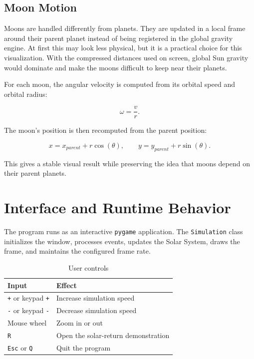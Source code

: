\documentclass[a4paper,12pt]{article}
\begin{document}
\subsection{Moon Motion}

Moons are handled differently from planets. They are updated in a local frame
around their parent planet instead of being registered in the global gravity
engine. At first this may look less physical, but it is a practical choice for
this visualization. With the compressed distances used on screen, global Sun
gravity would dominate and make the moons difficult to keep near their planets.

For each moon, the angular velocity is computed from its orbital speed and
orbital radius:

\begin{equation}
    \omega = \frac{v}{r}.
\end{equation}

The moon's position is then recomputed from the parent position:

\begin{equation}
    x = x_{parent} + r \cos(\theta), \qquad
    y = y_{parent} + r \sin(\theta).
\end{equation}

This gives a stable visual result while preserving the idea that moons depend
on their parent planets.

\section{Interface and Runtime Behavior}

The program runs as an interactive \texttt{pygame} application. The
\texttt{Simulation} class initializes the window, processes events, updates the
Solar System, draws the frame, and maintains the configured frame rate.

\begin{table}[H]
    \centering
    \caption{User controls}
    \label{tab:controls}
    \begin{tabular}{ll}
        \toprule
        Input & Effect \\
        \midrule
        \texttt{+} or keypad \texttt{+} & Increase simulation speed \\
        \texttt{-} or keypad \texttt{-} & Decrease simulation speed \\
        Mouse wheel & Zoom in or out \\
        \texttt{R} & Open the solar-return demonstration \\
        \texttt{Esc} or \texttt{Q} & Quit the program \\
        \bottomrule
    \end{tabular}
\end{table}
\end{document}
